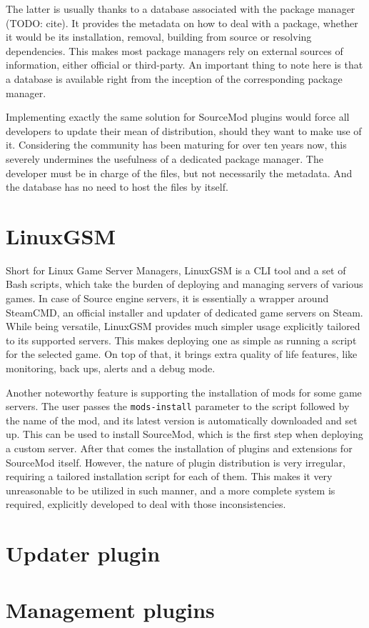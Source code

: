 The latter is usually thanks to a database associated with the package manager (TODO: cite).
It provides the metadata on how to deal with a package, whether it would be its installation, removal, building from source or resolving dependencies.
This makes most package managers rely on external sources of information, either official or third-party.
An important thing to note here is that a database is available right from the inception of the corresponding package manager.

Implementing exactly the same solution for SourceMod plugins would force all developers to update their mean of distribution, should they want to make use of it.
Considering the community has been maturing for over ten years now, this severely undermines the usefulness of a dedicated package manager.
The developer must be in charge of the files, but not necessarily the metadata.
And the database has no need to host the files by itself.

\section{LinuxGSM}

Short for Linux Game Server Managers, LinuxGSM is a CLI tool and a set of Bash scripts, which take the burden of deploying and managing servers of various games.
In case of Source engine servers, it is essentially a wrapper around SteamCMD, an official installer and updater of dedicated game servers on Steam.
While being versatile, LinuxGSM provides much simpler usage explicitly tailored to its supported servers.
This makes deploying one as simple as running a script for the selected game.
On top of that, it brings extra quality of life features, like monitoring, back ups, alerts and a debug mode.

Another noteworthy feature is supporting the installation of mods for some game servers.
The user passes the \verb|mods-install| parameter to the script followed by the name of the mod, and its latest version is automatically downloaded and set up.
This can be used to install SourceMod, which is the first step when deploying a custom server.
After that comes the installation of plugins and extensions for SourceMod itself.
However, the nature of plugin distribution is very irregular, requiring a tailored installation script for each of them.
This makes it very unreasonable to be utilized in such manner, and a more complete system is required, explicitly developed to deal with those inconsistencies.

\section{Updater plugin}
\label{updater-plugin}

\section{Management plugins}
